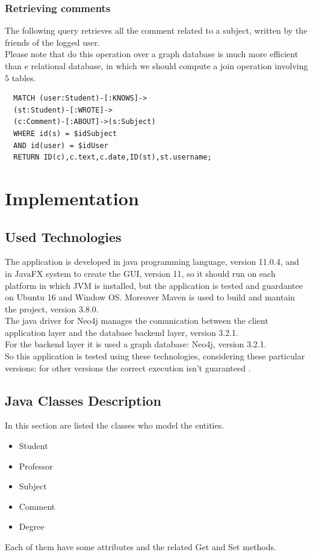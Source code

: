 \documentclass[a4paper]{article}
\begin{document}
\subsubsection{Retrieving comments}
The following query retrieves all the comment related to a subject, written by the friends of the logged user.\\
Please note that do this operation over a graph database is much more efficient than e relational database, in which we should compute a join operation involving 5 tables.
\begin{verbatim}
  MATCH (user:Student)-[:KNOWS]-> 
  (st:Student)-[:WROTE]->  
  (c:Comment)-[:ABOUT]->(s:Subject)  
  WHERE id(s) = $idSubject  
  AND id(user) = $idUser  
  RETURN ID(c),c.text,c.date,ID(st),st.username;
\end{verbatim}
\clearpage
\section{Implementation}

\subsection{Used Technologies}
The application is developed in java programming language, version 11.0.4, and in JavaFX system to create the GUI, version 11, so it should run on each platform in which JVM is installed, but the application is tested and guardantee on Ubuntu 16 and Window OS. Moreover Maven is used  to build and mantain the project, version 3.8.0. \\
The java driver for Neo4j manages the comunication between the client application layer and the database backend layer, version 3.2.1.\\ 
For the backend layer it is used a graph database: Neo4j, version 3.2.1.\\
So this application is tested using these technologies, considering these particular versions: for other versions the correct execution isn't guaranteed .

\subsection{Java Classes Description}

In this section are listed the classes who model the entities.
\begin{itemize}
\item Student
\item Professor
\item Subject
\item Comment
\item Degree
\end{itemize}
Each of them have some attributes and the related Get and Set methods.
\end{document}
